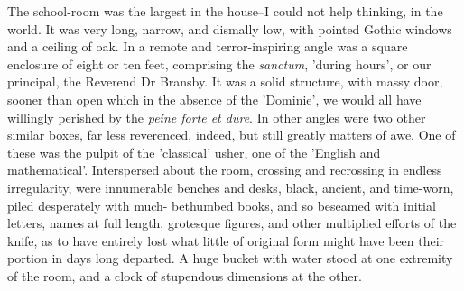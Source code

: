 \documentclass[12pt]{book}
\begin{document}
     The school-room was the largest in the house--I could not help
thinking, in the world.  It was very long, narrow, and dismally
low, with pointed Gothic windows and a ceiling of oak.  In a remote
and terror-inspiring angle was a square enclosure of eight or ten
feet, comprising the \emph{sanctum}, 'during hours', or our principal,
the Reverend Dr Bransby.  It was a solid structure, with massy
door, sooner than open which in the absence of the 'Dominie', we
would all have willingly perished by the \emph{peine forte et dure}. 
In other angles were two other similar boxes, far less reverenced,
indeed, but still greatly matters of awe.  One of these was the
pulpit of the 'classical' usher, one of the 'English and
mathematical'.  Interspersed about the room, crossing and
recrossing in endless irregularity, were innumerable benches and
desks, black, ancient, and time-worn, piled desperately with much-
bethumbed books, and so beseamed with initial letters, names at
full length, grotesque figures, and other multiplied efforts of the
knife, as to have entirely lost what little of original form might
have been their portion in days long departed.  A huge bucket with
water stood at one extremity of the room, and a clock of stupendous
dimensions at the other.
\end{document}
